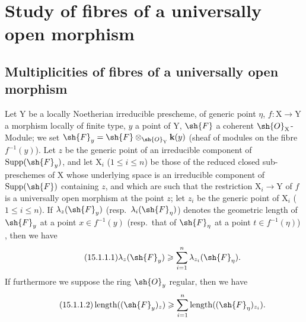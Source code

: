 \section{Study of fibres of a universally open morphism}
\label{section:IV.15}

\subsection{Multiplicities of fibres of a universally open morphism}
\label{subsection:IV.15.1}

\begin{proposition}[15.1.1]
\label{IV.15.1.1}
Let $\mathrm{Y}$ be a locally Noetherian irreducible prescheme, of generic point $\eta$, $f:\mathrm{X}\to\mathrm{Y}$ a morphism locally of finite type, $y$ a point of $\mathrm{Y}$, $\sh{F}$ a coherent $\sh{O}_\mathrm{X}$-Module;
we set $\sh{F}_y=\sh{F}\otimes_{\sh{O}_\mathrm{Y}}\mathbf{k}(y)$ (sheaf of modules on the fibre $f^{-1}(y)$).
Let $z$ be the generic point of an irreducible component of $\operatorname{Supp}(\sh{F}_y)$, and let $\mathrm{X}_i$ ($1\leqslant i\leqslant n$) be those of the reduced closed sub-preschemes of $\mathrm{X}$ whose underlying space is an irreducible component of $\operatorname{Supp}(\sh{F})$ containing $z$, and which are such that the restriction $\mathrm{X}_i\to\mathrm{Y}$ of $f$ is a universally open morphism at the point $z$; let $z_i$ be the generic point of $\mathrm{X}_i$ ($1\leqslant i\leqslant n$).
If $\lambda_z(\sh{F}_y)$ (resp.~$\lambda_i(\sh{F}_\eta)$) denotes the geometric length of $\sh{F}_y$ at a point $x\in f^{-1}(y)$ (resp.~that of $\sh{F}_\eta$ at a point $t\in f^{-1}(\eta)$) , then we have
\[
\tag{15.1.1.1}
\label{IV.15.1.1.1}
  \lambda_z(\sh{F}_y)\geqslant\sum_{i=1}^{n}\lambda_{z_i}(\sh{F}_\eta).
\]
If furthermore we suppose the ring $\sh{O}_y$ regular, then we have
\[
\tag{15.1.1.2}
\label{IV.15.1.1.2}
  \operatorname{length}((\sh{F}_y)_z)\geqslant\sum_{i=1}^{n}\operatorname{length}((\sh{F}_\eta)_{z_i}).
\]
\end{proposition}


